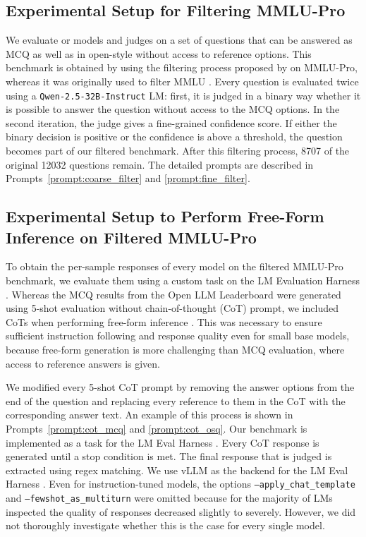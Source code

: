 \subsection{Experimental Setup for Filtering MMLU-Pro}\label{app:judge-filter}

We evaluate or models and judges on a set of questions that can be answered as MCQ as well as in open-style without access to reference options. This benchmark is obtained by using the filtering process proposed by \citet{myrzakhan2024openllmleaderboard} on MMLU-Pro, whereas it was originally used to filter MMLU \citep{hendrycks2021measuring, wang2024mmlupro}. Every question is evaluated twice using a \texttt{Qwen-2.5-32B-Instruct} LM: first, it is judged in a binary way whether it is possible to answer the question without access to the MCQ options. In the second iteration, the judge gives a fine-grained confidence score. If either the binary decision is positive or the confidence is above a threshold, the question becomes part of our filtered benchmark. After this filtering process, 8707 of the original 12032 questions remain. The detailed prompts are described in Prompts~\ref{prompt:coarse_filter} and \ref{prompt:fine_filter}.

\subsection{Experimental Setup to Perform Free-Form Inference on Filtered MMLU-Pro}\label{app:judge-osq_inference}

To obtain the per-sample responses of every model on the filtered MMLU-Pro benchmark, we evaluate them using a custom task on the LM Evaluation Harness \citep{eval-harness}. Whereas the MCQ results from the Open LLM Leaderboard were generated using 5-shot evaluation without chain-of-thought (CoT) prompt, we included CoTs when performing free-form inference \citep{myrzakhan2024openllmleaderboard}. This was necessary to ensure sufficient instruction following and response quality even for small base models, because free-form generation is more challenging than MCQ evaluation, where access to reference answers is given. 

We modified every 5-shot CoT prompt by removing the answer options from the end of the question and replacing every reference to them in the CoT with the corresponding answer text. An example of this process is shown in Prompts~\ref{prompt:cot_mcq} and \ref{prompt:cot_osq}. Our benchmark is implemented as a task for the LM Eval Harness \citep{eval-harness}. Every CoT response is generated until a stop condition is met. The final response that is judged is extracted using regex matching. We use vLLM as the backend for the LM Eval Harness \citep{kwon2023efficient}. Even for instruction-tuned models, the options \texttt{--apply\_chat\_template} and \texttt{--fewshot\_as\_multiturn} were omitted because for the majority of LMs inspected the quality of responses decreased slightly to severely. However, we did not thoroughly investigate whether this is the case for every single model.

